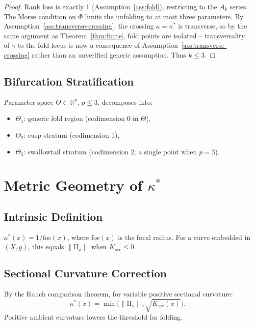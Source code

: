 \documentclass[14pt,a4paper]{extarticle}
\begin{document}
\begin{proof}
Rank loss is exactly 1 (Assumption~\ref{ass:fold}), restricting to the
$A_k$ series.
The Morse condition on $\Phi$ limits the unfolding to at most three
parameters.
By Assumption~\ref{ass:transverse-crossing}, the crossing
$\kappa=\kappa^*$ is transverse, so by the same argument as
Theorem~\ref{thm:finite}, fold points are isolated -- transversality of
$\gamma$ to the fold locus is now a consequence of
Assumption~\ref{ass:transverse-crossing} rather than an unverified
generic assumption.
Thus $k \leq 3$.
\end{proof}

\subsection{Bifurcation Stratification}

Parameter space $\Theta \subset \mathbb{R}^p$, $p \leq 3$,
decomposes into:
\begin{itemize}[leftmargin=2em]
  \item $\Theta_1$: generic fold region (codimension 0 in $\Theta$),
  \item $\Theta_2$: cusp stratum (codimension 1),
  \item $\Theta_3$: swallowtail stratum (codimension 2; a single point
    when $p = 3$).
\end{itemize}

\section{Metric Geometry of $\kappa^*$}
\label{sec:kappa}

\subsection{Intrinsic Definition}

$\kappa^*(x) = 1/\mathrm{foc}(x)$, where $\mathrm{foc}(x)$ is the
focal radius.
For a curve embedded in $(X, g)$, this equals $\|\mathrm{II}_x\|$
when $K_\mathrm{sec} \leq 0$.

\subsection{Sectional Curvature Correction}

By the Rauch comparison theorem, for variable positive sectional
curvature:
\[
  \kappa^*(x) = \min\!\bigl(\|\mathrm{II}_x\|,
    \sqrt{K_\mathrm{sec}(x)}\bigr).
\]
Positive ambient curvature lowers the threshold for folding.
\end{document}
